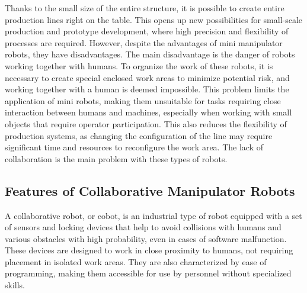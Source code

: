 Thanks to the small size of the entire structure, it is possible to create entire production lines right on the table. This opens up new possibilities for small-scale production and prototype development, where high precision and flexibility of processes are required. However, despite the advantages of mini manipulator robots, they have disadvantages. The main disadvantage is the danger of robots working together with humans. To organize the work of these robots, it is necessary to create special enclosed work areas to minimize potential risk, and working together with a human is deemed impossible.
This problem limits the application of mini robots, making them unsuitable for tasks requiring close interaction between humans and machines, especially when working with small objects that require operator participation. This also reduces the flexibility of production systems, as changing the configuration of the line may require significant time and resources to reconfigure the work area. The lack of collaboration is the main problem with these types of robots.

\subsection{Features of Collaborative Manipulator Robots}

A collaborative robot, or cobot, is an industrial type of robot equipped with a set of sensors and locking devices that help to avoid collisions with humans and various obstacles with high probability, even in cases of software malfunction. These devices are designed to work in close proximity to humans, not requiring placement in isolated work areas. They are also characterized by ease of programming, making them accessible for use by personnel without specialized skills.

